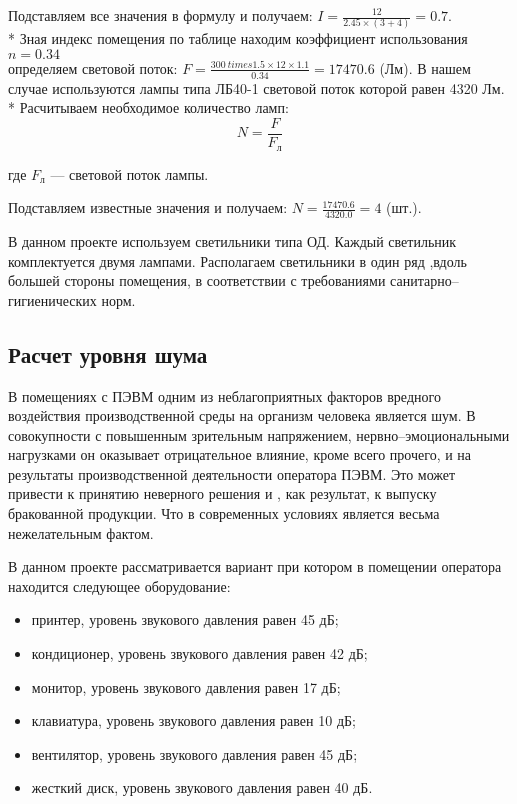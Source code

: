 Подставляем все значения в формулу и получаем: $I = \frac{12}{2.45 \times (3 + 4)} = 0.7$. \\*
Зная индекс помещения по таблице находим коэффициент использования $n = 0.34$ \\
определяем световой поток: $F = \frac{300 \ times 1.5 \times 12 \times 1.1}{0.34} = 17470.6$ (Лм).
В нашем случае используются лампы типа ЛБ40-1 световой поток которой равен 4320 Лм. \\*
Расчитываем необходимое количество ламп:
\begin{equation}
N = \frac{F}{F_{л}}
\end{equation}
\begin{ESKDexplanation}
	\item[где ]{} $F_{л}$ — световой поток лампы.
\end{ESKDexplanation}
Подставляем известные значения и получаем: $N = \frac{17470.6}{4320.0} = 4$ (шт.).

В данном проекте используем светильники типа ОД. Каждый светильник комплектуется двумя лампами.
Располагаем светильники в один ряд ,вдоль большей стороны помещения, в соответствии с требованиями
санитарно--гигиенических норм.


\subsection{Расчет уровня шума}
В помещениях с ПЭВМ одним из неблагоприятных факторов вредного воздействия производственной среды
на организм человека является шум. В совокупности с повышенным зрительным напряжением,
нервно--эмоциональными нагрузками он оказывает отрицательное влияние, кроме всего прочего,
и на результаты производственной деятельности оператора ПЭВМ.
Это может привести к принятию неверного решения и , как результат, к выпуску бракованной
продукции. Что в современных условиях является весьма нежелательным фактом.


В данном проекте рассматривается вариант при котором в помещении оператора
находится следующее оборудование:
\begin{itemize}
	\item{} принтер, уровень звукового давления равен 45 дБ;
	\item{} кондиционер, уровень звукового давления равен 42 дБ;
	\item{} монитор, уровень звукового давления равен 17 дБ;
	\item{} клавиатура, уровень звукового давления равен 10 дБ;
	\item{} вентилятор, уровень звукового давления равен 45 дБ;
	\item{} жесткий диск, уровень звукового давления равен 40 дБ.
\end{itemize}


